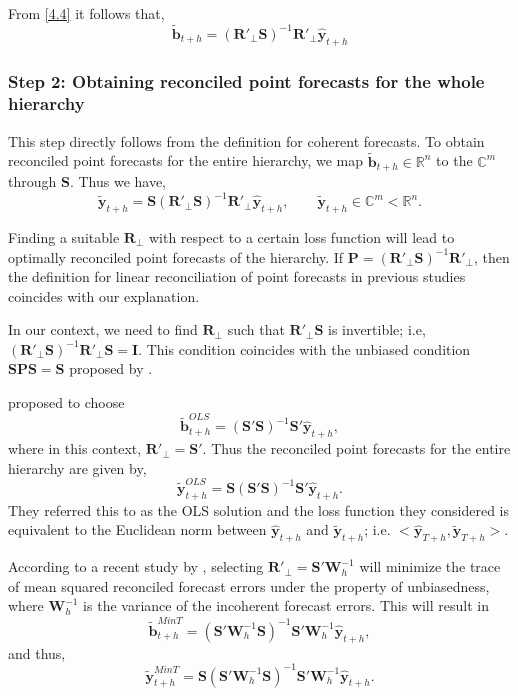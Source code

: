 \documentclass[a4paper, 11pt]{article}
\begin{document}
From \eqref{4.4} it follows that,
\begin{equation}
\tilde{\bm{b}}_{t+h}=(\bm{R}'_\bot \bm{S})^{-1}\bm{R}'_\bot \hat{\bm{y}}_{t+h}
\end{equation}

\subsubsection*{Step 2: Obtaining reconciled point forecasts for the whole hierarchy}

This step directly follows from the definition for coherent forecasts. To obtain reconciled point forecasts for the entire hierarchy, we map $\tilde{\bm{b}}_{t+h} \in \mathbb{R}^n$ to the $\mathbb{C}^m$ through $\bm{S}$. Thus we have, 
\begin{equation}
\tilde{\bm{y}}_{t+h}=\bm{S}(\bm{R}'_\bot \bm{S})^{-1}\bm{R}'_\bot \hat{\bm{y}}_{t+h}, \qquad \tilde{\bm{y}}_{t+h} \in \mathbb{C}^m<\mathbb{R}^n.
\end{equation}

Finding a suitable $\bm{R}_\bot$ with respect to a certain loss function will lead to optimally reconciled point forecasts of the hierarchy. If $\bm{P}=(\bm{R}'_\bot \bm{S})^{-1}\bm{R}'_\bot$, then the definition for linear reconciliation of point forecasts in previous studies coincides with our explanation.

In our context, we need to find $\bm{R}_\bot$ such that $\bm{R}'_\bot \bm{S}$ is invertible; i.e, $(\bm{R}'_\bot \bm{S})^{-1}\bm{R}'_\bot \bm{S}=\bm{I}$. This condition coincides with the unbiased condition $\bm{SPS}=\bm{S}$ proposed by \citet{Hyndman2011}.

\citet{Hyndman2011} proposed to choose
\begin{equation*}
\tilde{\bm{b}}^{OLS}_{t+h}=(\bm{S}' \bm{S})^{-1}\bm{S}' \hat{\bm{y}}_{t+h},
\end{equation*}
where in this context, $\bm{R}'_\bot = \bm{S}'$. Thus the reconciled point forecasts for the entire hierarchy are given by,
\begin{equation}
\tilde{\bm{y}}^{OLS}_{t+h}=\bm{S}(\bm{S}' \bm{S})^{-1}\bm{S}' \hat{\bm{y}}_{t+h}.
\end{equation}
They referred this to as the OLS solution and the loss function they considered is equivalent to the Euclidean norm between $\hat{\bm{y}}_{t+h}$ and $\tilde{\bm{y}}_{t+h}$; i.e. $<\hat{\bm{y}}_{T+h}, \tilde{\bm{y}}_{T+h}>$.

According to a recent study by \citet{Wickramasuriya2017}, selecting $\bm{R}'_\bot = \bm{S}'\bm{W}^{-1}_{h}$ will minimize the trace of mean squared reconciled forecast errors under the property of unbiasedness, where $\bm{W}^{-1}_{h}$ is the variance of the incoherent forecast errors. This will result in
\begin{equation*}
\tilde{\bm{b}}^{MinT}_{t+h}=(\bm{S}'\bm{W}^{-1}_{h} \bm{S})^{-1}\bm{S}'\bm{W}^{-1}_{h} \hat{\bm{y}}_{t+h},
\end{equation*}
and thus,
\begin{equation}
\tilde{\bm{y}}^{MinT}_{t+h}=\bm{S}(\bm{S}' \bm{W}^{-1}_{h}\bm{S})^{-1}\bm{S}'\bm{W}^{-1}_{h} \hat{\bm{y}}_{t+h}.
\end{equation}
\end{document}
